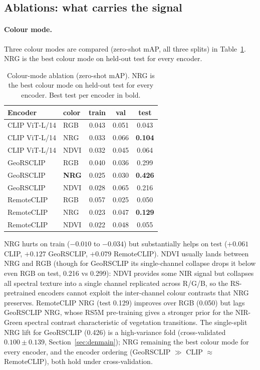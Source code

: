 \documentclass{article}
\begin{document}
\subsection{Ablations: what carries the signal}
\label{sec:ablations}

\paragraph{Colour mode.}
Three colour modes are compared (zero-shot mAP, all three splits) in
Table~\ref{tab:nir}. NRG is the best colour mode on held-out test for every
encoder.

\begin{table}[H]
    \centering
    \caption{Colour-mode ablation (zero-shot mAP). NRG is the best colour mode on
    held-out test for every encoder. Best test per encoder in bold.}
    \label{tab:nir}
    \begin{tabular}{llccc}
        \toprule
        \textbf{Encoder} & \textbf{color} & \textbf{train} & \textbf{val} & \textbf{test} \\
        \midrule
        CLIP ViT-L/14 & RGB  & 0.043 & 0.051 & 0.043 \\
        CLIP ViT-L/14 & NRG  & 0.033 & 0.066 & \textbf{0.104} \\
        CLIP ViT-L/14 & NDVI & 0.032 & 0.045 & 0.064 \\
        GeoRSCLIP     & RGB  & 0.040 & 0.036 & 0.299 \\
        GeoRSCLIP     & \textbf{NRG}  & 0.025 & 0.030 & \textbf{0.426} \\
        GeoRSCLIP     & NDVI & 0.028 & 0.065 & 0.216 \\
        RemoteCLIP    & RGB  & 0.057 & 0.025 & 0.050 \\
        RemoteCLIP    & NRG  & 0.023 & 0.047 & \textbf{0.129} \\
        RemoteCLIP    & NDVI & 0.022 & 0.048 & 0.055 \\
        \bottomrule
    \end{tabular}
\end{table}

NRG hurts on train ($-0.010$ to $-0.034$) but substantially helps on test
($+0.061$ CLIP, $+0.127$ GeoRSCLIP, $+0.079$ RemoteCLIP). NDVI usually lands
between NRG and RGB (though for GeoRSCLIP its single-channel collapse drops it
below even RGB on test, 0.216 vs 0.299): NDVI provides some NIR signal but
collapses all spectral texture into a single channel replicated across R/G/B, so
the RS-pretrained encoders cannot exploit the inter-channel colour contrasts that
NRG preserves. RemoteCLIP NRG (test 0.129) improves over RGB (0.050) but lags
GeoRSCLIP NRG, whose RS5M pre-training gives a stronger prior for the NIR-Green
spectral contrast characteristic of vegetation transitions. The single-split NRG
lift for GeoRSCLIP (0.426) is a high-variance fold (cross-validated
$0.100 \pm 0.139$, Section~\ref{sec:denmain}); NRG remaining the best colour mode
for every encoder, and the encoder ordering (GeoRSCLIP $\gg$ CLIP $\approx$
RemoteCLIP), both hold under cross-validation.
\end{document}
